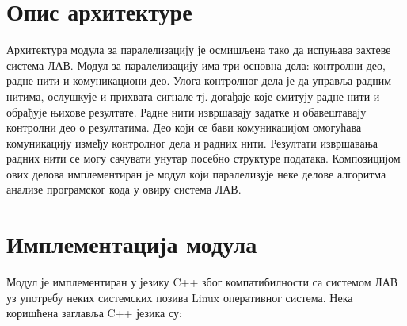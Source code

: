 \documentclass[12pt,oneside]{memoir}
\begin{document}
\section{Опис архитектуре}

Архитектура модула за паралелизацију је осмишљена тако да испуњава захтеве система ЛАВ. Модул за паралелизацију има три основна дела: контролни део, радне нити и комуникациони део. Улога контролног дела је да управља радним нитима, ослушкује и прихвата сигнале тј. догађаје које емитују радне нити и обрађује њихове резултате. Радне нити извршавају задатке и обавештавају контролни део о резултатима. Део који се бави комуникацијом омогућава комуникацију између контролног дела и радних нити. Резултати извршавања радних нити се могу сачувати унутар посебно структуре података. Композицијом ових делова имплементиран је модул који паралелизује неке делове алгоритма анализе програмског кода у овиру система ЛАВ.
\newpage


\section{Имплементација модула}
Модул је имплементиран у језику C++ због компатибилности са системом ЛАВ уз употребу неких системских позива Linux оперативног система. Нека коришћена заглавља C++ језика су: \cite{cpp}
\end{document}
